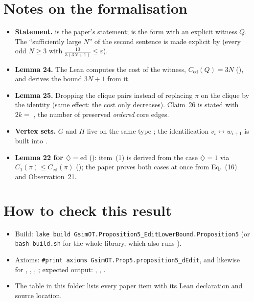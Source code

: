 \section{Notes on the formalisation}
\begin{itemize}
\item \textbf{Statement.}  is the paper's statement;  is
  the form with an explicit witness $Q$. The ``sufficiently large $N$'' of the second sentence is made explicit by
   (every odd $N\ge3$ with $\frac{10}{3(3N+1)}\le\varepsilon$).
\item \textbf{Lemma 24.} The Lean computes the cost of the witness, $C_{\mathrm{ed}}(Q)=3N$
  (), and  derives the bound $3N+1$ from it.
\item \textbf{Lemma 25.} Dropping the clique pairs instead of replacing $\pi$ on the clique by the identity
  (same effect: the cost only decreases). Claim~26 is stated with $2k=$ , the number of
  preserved \emph{ordered} core edges.
\item \textbf{Vertex sets.} $G$ and $H$ live on the same type ; the identification
  $v_i\leftrightarrow w_{i+1}$ is built into .
\item \textbf{Lemma 22 for $\diamondsuit=\mathrm{ed}$} (): item~(1)
  is derived from the case $\diamondsuit=1$ via $C_1(\pi)\le C_{\mathrm{ed}}(\pi)$
  (); the paper proves both cases at once from Eq.~(16) and Observation~21.
\end{itemize}

\section{How to check this result}
\begin{itemize}
\item Build: \texttt{lake build GsimOT.Proposition5\_EditLowerBound.Proposition5} (or \texttt{bash build.sh}
  for the whole library, which also runs ).
\item Axioms: \texttt{\#print axioms GsimOT.Prop5.proposition5\_dEdit}, and likewise for
  , , , ;
  expected output: , , .
\item The table  in this folder lists every paper item with its
  Lean declaration and source location.
\end{itemize}

